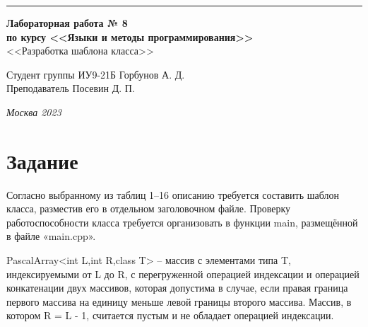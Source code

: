 \documentclass[a4paper, 14pt]{extarticle}
\begin{document}
\begin{titlepage}
\vspace*{-16pt}
\hspace{30pt}\rule{0.866\textwidth}{0.4pt}
  
\vspace{11em}

\begin{center}
\Large {\bf Лабораторная работа № 8} \\ 
\large {\bf по курсу <<Языки и методы программирования>>} \\
\large <<Разработка шаблона класса>> 
\end{center}\normalsize

\vspace{8em}


\begin{flushright}
  {Студент группы ИУ9-21Б Горбунов А. Д. \hspace*{15pt}\\ 
  \vspace{2ex}
  Преподаватель Посевин Д. П.\hspace*{15pt}}
\end{flushright}

\bigskip

\vfill
 

\begin{center}
\textsl{Москва 2023}
\end{center}
\end{titlepage}

\renewcommand{\ttdefault}{pcr}

\setlength{\tabcolsep}{3pt}
\newpage
\setcounter{page}{2}

\section{Задание}\label{Sect::task}
	Согласно выбранному из таблиц 1–16 описанию требуется составить шаблон класса, разместив его в отдельном заголовочном файле. Проверку работоспособности класса требуется организовать в функции main, размещённой в файле «main.cpp».

    PascalArray<int L,int R,class T> – массив с элементами типа T, индексируемыми от L до R, с перегруженной операцией индексации и операцией конкатенации двух массивов, которая допустима в случае, если правая граница первого массива на единицу меньше левой границы второго массива. Массив, в котором R = L - 1, считается пустым и не обладает операцией индексации.
\end{document}
